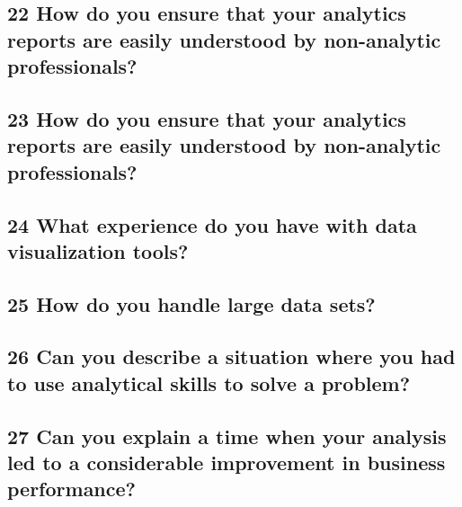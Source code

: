 \documentclass[
  letterpaper,
]{scrbook}
\begin{document}
\subsection{\texorpdfstring{\textbf{22 How do you ensure that your
analytics reports are easily understood by non-analytic
professionals?}}{22 How do you ensure that your analytics reports are easily understood by non-analytic professionals?}}\label{how-do-you-ensure-that-your-analytics-reports-are-easily-understood-by-non-analytic-professionals}

\subsection{\texorpdfstring{\textbf{23 How do you ensure that your
analytics reports are easily understood by non-analytic
professionals?}}{23 How do you ensure that your analytics reports are easily understood by non-analytic professionals?}}\label{how-do-you-ensure-that-your-analytics-reports-are-easily-understood-by-non-analytic-professionals-1}

\subsection{\texorpdfstring{\textbf{24 What experience do you have with
data visualization
tools?}}{24 What experience do you have with data visualization tools?}}\label{what-experience-do-you-have-with-data-visualization-tools}

\subsection{\texorpdfstring{\textbf{25 How do you handle large data
sets?}}{25 How do you handle large data sets?}}\label{how-do-you-handle-large-data-sets}

\subsection{\texorpdfstring{\textbf{26 Can you describe a situation
where you had to use analytical skills to solve a
problem?}}{26 Can you describe a situation where you had to use analytical skills to solve a problem?}}\label{can-you-describe-a-situation-where-you-had-to-use-analytical-skills-to-solve-a-problem}

\subsection{\texorpdfstring{\textbf{27 Can you explain a time when your
analysis led to a considerable improvement in business
performance?}}{27 Can you explain a time when your analysis led to a considerable improvement in business performance?}}\label{can-you-explain-a-time-when-your-analysis-led-to-a-considerable-improvement-in-business-performance}
\end{document}
